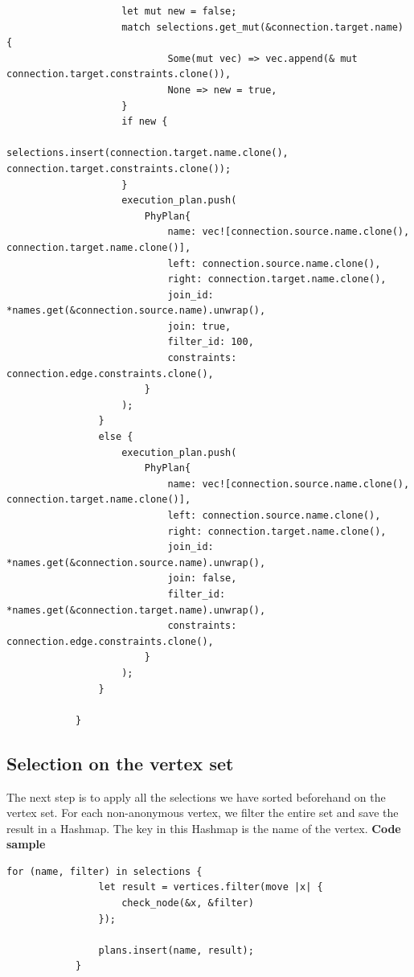 \documentclass[11pt,singlecolumn]{scrartcl}
\begin{document}
\begin{lstlisting}
                    let mut new = false;
                    match selections.get_mut(&connection.target.name) {
                            Some(mut vec) => vec.append(& mut connection.target.constraints.clone()),
                            None => new = true,
                    }
                    if new {
                            selections.insert(connection.target.name.clone(), connection.target.constraints.clone());
                    }
                    execution_plan.push(
                        PhyPlan{ 
                            name: vec![connection.source.name.clone(), connection.target.name.clone()],
                            left: connection.source.name.clone(),
                            right: connection.target.name.clone(),
                            join_id: *names.get(&connection.source.name).unwrap(),
                            join: true,
                            filter_id: 100,
                            constraints: connection.edge.constraints.clone(),
                        }
                    );
                }
                else {
                    execution_plan.push(
                        PhyPlan{ 
                            name: vec![connection.source.name.clone(), connection.target.name.clone()],
                            left: connection.source.name.clone(),
                            right: connection.target.name.clone(),
                            join_id: *names.get(&connection.source.name).unwrap(),
                            join: false,
                            filter_id: *names.get(&connection.target.name).unwrap(),
                            constraints: connection.edge.constraints.clone(),
                        }
                    );
                }

            }
\end{lstlisting}
\subsection{Selection on the vertex set}
The next step is to apply all the selections we have sorted beforehand on the vertex set. For each non-anonymous vertex, we filter the entire set and save the result in a Hashmap. The key in this Hashmap is the name of the vertex.
\textbf{Code sample}
\begin{lstlisting}
for (name, filter) in selections {
                let result = vertices.filter(move |x| {
                    check_node(&x, &filter)
                });

                plans.insert(name, result);
            }
\end{lstlisting}
\end{document}
